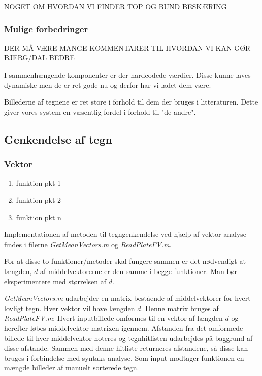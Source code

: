 NOGET OM HVORDAN VI FINDER TOP OG BUND BESKÆRING


\subsubsection{Mulige forbedringer}
DER MÅ VÆRE MANGE KOMMENTARER TIL HVORDAN VI KAN GØR BJERG/DAL BEDRE

I sammenhængende komponenter er der hardcodede værdier. Disse kunne laves dynamiske men de er ret gode nu og derfor har vi ladet dem være.

Billederne af tegnene er ret store i forhold til dem der bruges i litteraturen. Dette giver vores system en væsentlig fordel i forhold til "de andre".

\subsection{Genkendelse af tegn}

\subsubsection{Vektor}

\begin{enumerate}
\item funktion pkt 1
\item funktion pkt 2
\item funktion pkt n
\end{enumerate}

Implementationen af metoden til tegngenkendelse ved hjælp af vektor analyse findes i filerne \textit{GetMeanVectors.m} og \textit{ReadPlateFV.m}.

For at disse to funktioner/metoder skal fungere sammen er det nødvendigt at længden, $d$ af middelvektorerne er den samme i begge funktioner. Man bør eksperimentere med størrelsen af $d$.

\textit{GetMeanVectors.m} udarbejder en matrix bestående af middelvektorer for hvert lovligt tegn. Hver vektor vil have længden $d$. Denne matrix bruges af \textit{ReadPlateFV.m}: Hvert inputbillede omformes til en vektor af længden $d$ og herefter løbes middelvektor-matrixen igennem. Afstanden fra det omformede billede til hver middelvektor noteres og tegnhitlisten udarbejdes på baggrund af disse afstande. Sammen med denne hitliste returneres afstandene, så disse kan bruges i forbindelse med syntaks analyse.
Som input modtager funktionen en mængde billeder af manuelt sorterede tegn.

